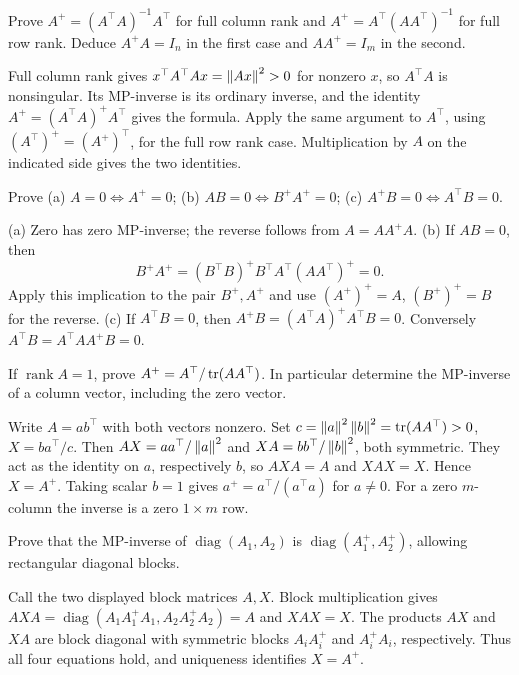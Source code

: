 \begin{problem}\label{ex:10:full-rank}
Prove \(A^+=(A^\top A)^{-1}A^\top\) for full column rank and
\(A^+=A^\top(AA^\top)^{-1}\) for full row rank.
Deduce \(A^+A=I_n\) in the first case and \(AA^+=I_m\) in the second.
\end{problem}
\begin{solution}
Full column rank gives \(x^\top A^\top Ax=\left\lVert Ax\right\rVert^2>0\) for nonzero
\(x\), so \(A^\top A\) is nonsingular. Its MP-inverse is its ordinary
inverse, and the identity \(A^+=(A^\top A)^+A^\top\) gives the formula.
Apply the same argument to \(A^\top\), using
\((A^\top)^+=(A^+)^\top\), for the full row rank case.
Multiplication by \(A\) on the indicated side gives the two identities.
\end{solution}

\begin{problem}\label{ex:10:zero-products}
Prove (a) \(A=0\iff A^+=0\);
(b) \(AB=0\iff B^+A^+=0\);
(c) \(A^+B=0\iff A^\top B=0\).
\end{problem}
\begin{solution}
(a) Zero has zero MP-inverse; the reverse follows from \(A=AA^+A\).
(b) If \(AB=0\), then
\[
B^+A^+=(B^\top B)^+B^\top A^\top(AA^\top)^+=0.
\]
Apply this implication to the pair \(B^+,A^+\) and use
\((A^+)^+=A\), \((B^+)^+=B\) for the reverse.
(c) If \(A^\top B=0\), then \(A^+B=(A^\top A)^+A^\top B=0\).
Conversely \(A^\top B=A^\top AA^+B=0\).
\end{solution}

\begin{problem}\label{ex:10:rank-one}
If \(\operatorname{rank}A=1\), prove
\(A^+=A^\top/\operatorname{tr}(AA^\top)\). In particular determine the MP-inverse
of a column vector, including the zero vector.
\end{problem}
\begin{solution}
Write \(A=ab^\top\) with both vectors nonzero. Set
\(c=\left\lVert a\right\rVert^2\left\lVert b\right\rVert^2=\operatorname{tr}(AA^\top)>0\), \(X=ba^\top/c\).
Then \(AX=aa^\top/\left\lVert a\right\rVert^2\) and \(XA=bb^\top/\left\lVert b\right\rVert^2\),
both symmetric. They act as the identity on \(a\), respectively \(b\),
so \(AXA=A\) and \(XAX=X\). Hence \(X=A^+\).
Taking scalar \(b=1\) gives \(a^+=a^\top/(a^\top a)\) for \(a\ne0\).
For a zero \(m\)-column the inverse is a zero \(1\times m\) row.
\end{solution}

\begin{problem}\label{ex:10:block-diagonal}
Prove that the MP-inverse of \(\operatorname{diag}(A_1,A_2)\) is
\(\operatorname{diag}(A_1^+,A_2^+)\), allowing rectangular diagonal blocks.
\end{problem}
\begin{solution}
Call the two displayed block matrices \(A,X\). Block multiplication gives
\(AXA=\operatorname{diag}(A_1A_1^+A_1,A_2A_2^+A_2)=A\)
and \(XAX=X\). The products \(AX\) and \(XA\) are block diagonal
with symmetric blocks \(A_iA_i^+\) and \(A_i^+A_i\), respectively.
Thus all four equations hold, and uniqueness identifies \(X=A^+\).
\end{solution}

